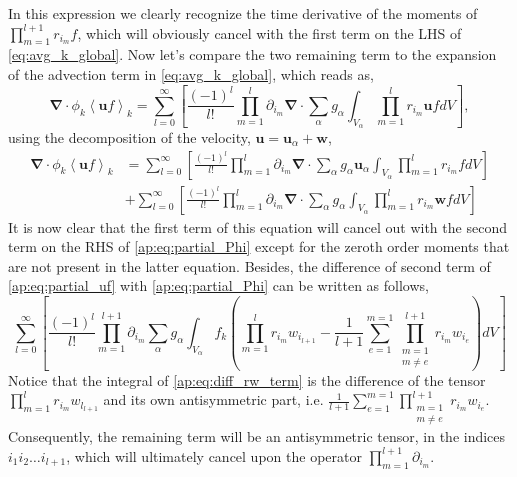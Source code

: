 \documentclass[twocolumn]{My_article}
\newcommand{\kavg}[1]{\left<#1\right>_k}
\newcommand{\partialp}[2]{ \prod_{m=#1}^{#2} \partial_{i_m}}
\newcommand{\pri}[2]{ \prod_{m=#1}^{#2} r_{i_m}}
\newcommand{\nablab}{\bm{\nabla}}
\begin{document}
In this expression we clearly recognize the time derivative of the moments of $\pri{1}{l+1}f$, which will obviously cancel with the first term on the LHS of \ref{eq:avg_k_global}.
Now let's compare the two remaining term to the expansion of the advection term in \ref{eq:avg_k_global}, which reads as,
\begin{equation}
    \nablab \cdot \phi_k \kavg{\textbf{u} f}
    = \sum_{l=0}^\infty
    \left[
        \frac{(-1)^l}{l!} \prod^{l}_{m=1}\partial_{i_m}
        \nablab \cdot
        \sum_\alpha  g_\alpha \int_{V_\alpha} \prod^l_{m=1}r_{i_m} \textbf{u} f dV
    \right],
\end{equation}
using the decomposition of the velocity, $\textbf{u} = \textbf{u}_\alpha + \textbf{w}$,
\begin{align}
    \nablab \cdot \phi_k \kavg{\textbf{u} f}
    &= \sum_{l=0}^\infty
    \left[
        \frac{(-1)^l}{l!} \prod^{l}_{m=1}\partial_{i_m}
        \nablab \cdot
        \sum_\alpha  g_\alpha \textbf{u}_\alpha  \int_{V_\alpha} \prod^l_{m=1}r_{i_m} f dV
    \right]\\
    &+ \sum_{l=0}^\infty
    \left[
        \frac{(-1)^l}{l!} \prod^{l}_{m=1}\partial_{i_m}
        \nablab \cdot
        \sum_\alpha  g_\alpha \int_{V_\alpha} \prod^l_{m=1}r_{i_m} \textbf{w} f dV
    \right]
    \label{ap:eq:partial_uf}
\end{align}
It is now clear that the first term of this equation will cancel out with the second term on the RHS of \ref{ap:eq:partial_Phi} except for the zeroth order moments that are not present in the latter equation.
Besides, the difference of second term of \ref{ap:eq:partial_uf} with \ref{ap:eq:partial_Phi} can be written as follows,
\begin{equation}
    \sum_{l=0}^\infty
    \left[
        \frac{(-1)^l}{l!} \prod^{l+1}_{m=1}\partial_{i_m}
        \sum_\alpha  g_\alpha
        \int_{V_\alpha} f_k\left(
            \prod^l_{m=1}r_{i_m} w_{i_{l+1}}
            -
            \frac{1}{l+1}
            \sum_{e=1}^{m=1}
            \prod^{l+1}_{\substack{m=1\\ m\neq e}}
            r_{i_m}
            w_{i_e}
        \right)
        dV
    \right]
    \label{ap:eq:diff_rw_term}
\end{equation}
Notice that the integral of \ref{ap:eq:diff_rw_term} is the difference of the tensor $\pri{1}{l}w_{l_{l+1}}$ and its own antisymmetric part, i.e. $\frac{1}{l+1} \sum_{e=1}^{m=1} \prod^{l+1}_{\substack{m=1\\ m\neq e}} r_{i_m} w_{i_e}$.
Consequently, the remaining term will be an antisymmetric tensor, in the indices $i_1i_2\ldots i_{l+1}$, which will ultimately cancel upon the operator $\partialp{1}{l+1}$.
\end{document}
